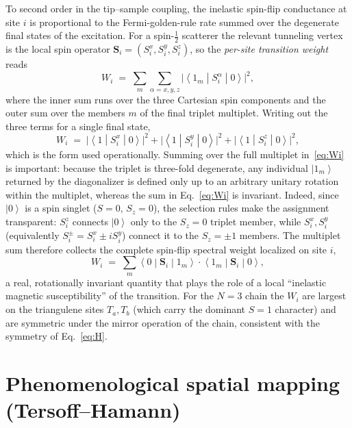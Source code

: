 \documentclass[11pt,a4paper]{article}
\newcommand{\ket}[1]{\left|#1\right\rangle}
\newcommand{\melem}[3]{\left\langle#1\middle|#2\middle|#3\right\rangle}
\renewcommand{\vec}[1]{\mathbf{#1}}
\begin{document}
To second order in the tip--sample coupling, the inelastic spin-flip conductance
at site $i$ is proportional to the Fermi-golden-rule rate summed over the
degenerate final states of the excitation. For a spin-$\tfrac12$ scatterer the
relevant tunneling vertex is the local spin operator
$\vec S_i=(S_i^x,S_i^y,S_i^z)$, so the \emph{per-site transition weight} reads
\begin{equation}
  W_i \;=\; \sum_{m}\sum_{\alpha=x,y,z}
            \big|\melem{1_m}{S_i^{\alpha}}{0}\big|^{2},
  \label{eq:Wi}
\end{equation}
where the inner sum runs over the three Cartesian spin components and the outer
sum over the members $m$ of the final triplet multiplet. Writing out the three
terms for a single final state,
\begin{equation}
  W_i \;=\; \big|\melem{1}{S_i^{x}}{0}\big|^{2}
          + \big|\melem{1}{S_i^{y}}{0}\big|^{2}
          + \big|\melem{1}{S_i^{z}}{0}\big|^{2},
  \label{eq:Wi-single}
\end{equation}
which is the form used operationally. Summing over the full multiplet
in~\eqref{eq:Wi} is important: because the triplet is three-fold degenerate,
any individual $\ket{1_m}$ returned by the diagonalizer is defined only up to an
arbitrary unitary rotation within the multiplet, whereas the sum in
Eq.~\eqref{eq:Wi} is invariant. Indeed, since $\ket{0}$ is a spin singlet
($S=0,\,S_z=0$), the selection rules make the assignment transparent:
$S_i^{z}$ connects $\ket{0}$ only to the $S_z=0$ triplet member, while
$S_i^{x},S_i^{y}$ (equivalently $S_i^{\pm}=S_i^{x}\pm i S_i^{y}$) connect it to the
$S_z=\pm1$ members. The multiplet sum therefore collects the complete spin-flip
spectral weight localized on site $i$,
\begin{equation}
  W_i \;=\; \sum_{m}\melem{0}{\vec S_i}{1_m}\cdot\melem{1_m}{\vec S_i}{0},
\end{equation}
a real, rotationally invariant quantity that plays the role of a local
``inelastic magnetic susceptibility'' of the transition. For the $N=3$ chain the
$W_i$ are largest on the triangulene sites $T_a,T_b$ (which carry the dominant
$S=1$ character) and are symmetric under the mirror operation of the chain,
consistent with the symmetry of Eq.~\eqref{eq:H}.

\section{Phenomenological spatial mapping (Tersoff--Hamann)}
\end{document}
